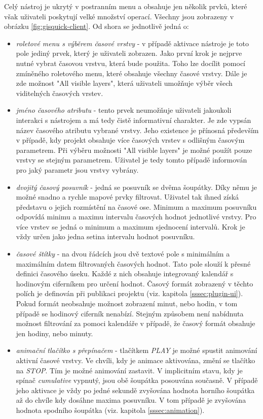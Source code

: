 Celý nástroj je ukrytý v postranním menu a obsahuje jen několik prvků,
které však uživateli poskytují velké množství operací. Všechny
jsou zobrazeny v obrázku \ref{fig:gisquick-client}. Od shora se jednotlivě
jedná o:

\begin{itemize}
\item\textit{roletové menu s výběrem časové vrstvy} - v
případě aktivace nástroje je toto pole jediný prvek, který
je uživateli zobrazen. Jako první krok je nejprve nutné vybrat
časovou vrstvu, která bude použita. Toho lze docílit pomocí
zmíněného roletového menu, které obsahuje všechny časové
vrstvy. Dále je zde možnost "All visible layers", která uživateli
umožňuje výběr všech viditelných časových vrstev.
\item\textit{jméno časového atributu} - tento prvek neumožňuje
uživateli jakoukoli interakci s nástrojem a má tedy čistě
informativní charakter. Je zde vypsán název časového atributu
vybrané vrstvy. Jeho existence je přínosná především v
případě, kdy projekt obsahuje více časových vrstev s odlišným
časovým parametrem. Při výběru možnosti "All visible layers" je
možné použít pouze vrstvy se stejným parametrem. Uživatel je tedy
tomto případě informován pro jaký parametr jsou vrstvy vybrány.
\item\textit{dvojitý časový posuvník} - jedná se posuvník
se dvěma
šoupátky. Díky němu je možné snadno a rychle mapové
prvky filtrovat. Uživatel tak ihned získá představu o jejich
rozmístění na časové ose. Minimum a maximum posuvníku odpovídá
minimu a maximu intervalu časových hodnot jednotlivé vrstvy. Pro
více vrstev se jedná o minimum a maximum sjednocení intervalů. Krok
je vždy určen jako jedna setina intervalu hodnot posuvníku.
\item\textit{časové štítky} - na dvou řádcích jsou dvě
textové pole s minimálním a maximálním datem filtrovaných
časových hodnot. Tato pole slouží k přesné definici
časového úseku. Každé z nich obsahuje integrovaný kalendář
s hodinovým ciferníkem pro určení hodnot. Časový formát
zobrazený v těchto polích je definován při publikaci projektu
(viz. kapitola \ref{sssec:plugin-ui}). Pokud formát neobsahuje
možnost zobrazení minut, nebo hodin, v tom případě se hodinový
ciferník nenabízí. Stejným způsobem není nabídnuta možnost
filtrování za pomoci kalendáře v případě, že časový formát
obsahuje jen hodiny, nebo minuty.
\item\textit{animační tlačítko s přepínačem} - tlačítkem \textit{PLAY}
je možné spustit animování aktivní časové vrstvy.  Ve chvíli, kdy je animace aktivována, změní se tlačítko na \textit{STOP}. Tím je možné animování zastavit. V implicitním stavu, kdy je spínač \textit{cumulative} vypnutý, jsou obě šoupátka posouvána současně. V případě jeho aktivace je vždy po jedné sekundě zvyšována hodnota horního šoupátka až do chvíle kdy dosáhne maxima posuvníku. V tom případě je zvyšována hodnota spodního šoupátka (viz. kapitola \ref{sssec:animation}).
\end{itemize}

